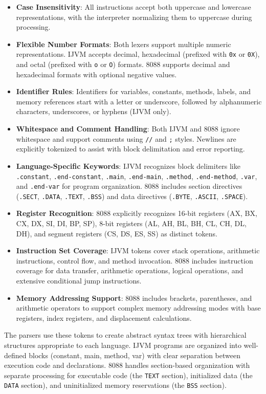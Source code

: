 \documentclass[11pt]{article}
\begin{document}
\begin{itemize}
\item \textbf{Case Insensitivity}: All instructions accept both uppercase and lowercase representations, with the interpreter normalizing them to uppercase during processing.
\item \textbf{Flexible Number Formats}: Both lexers support multiple numeric representations. IJVM accepts decimal, hexadecimal (prefixed with \texttt{0x} or \texttt{0X}), and octal (prefixed with \texttt{o} or \texttt{O}) formats. 8088 supports decimal and hexadecimal formats with optional negative values.
\item \textbf{Identifier Rules}: Identifiers for variables, constants, methods, labels, and memory references start with a letter or underscore, followed by alphanumeric characters, underscores, or hyphens (IJVM only).
\item \textbf{Whitespace and Comment Handling}: Both IJVM and 8088 ignore whitespace and support comments using \texttt{//} and \texttt{;} styles. Newlines are explicitly tokenized to assist with block delimitation and error reporting.
\item \textbf{Language-Specific Keywords}: IJVM recognizes block delimiters like \texttt{.constant}, \texttt{.end-constant}, \texttt{.main}, \texttt{.end-main}, \texttt{.method}, \texttt{.end-method}, \texttt{.var}, and \texttt{.end-var} for program organization. 8088 includes section directives (\texttt{.SECT}, \texttt{.DATA}, \texttt{.TEXT}, \texttt{.BSS}) and data directives (\texttt{.BYTE}, \texttt{.ASCII}, \texttt{.SPACE}).
\item \textbf{Register Recognition}: 8088 explicitly recognizes 16-bit registers (AX, BX, CX, DX, SI, DI, BP, SP), 8-bit registers (AL, AH, BL, BH, CL, CH, DL, DH), and segment registers (CS, DS, ES, SS) as distinct tokens.
\item \textbf{Instruction Set Coverage}: IJVM tokens cover stack operations, arithmetic instructions, control flow, and method invocation. 8088 includes instruction coverage for data transfer, arithmetic operations, logical operations, and extensive conditional jump instructions.
\item \textbf{Memory Addressing Support}: 8088 includes brackets, parentheses, and arithmetic operators to support complex memory addressing modes with base registers, index registers, and displacement calculations.
\end{itemize}

The parsers use these tokens to create abstract syntax trees with hierarchical structures appropriate to each language. IJVM programs are organized into well-defined blocks (constant, main, method, var) with clear separation between execution code and declarations. 8088 handles section-based organization with separate processing for executable code (the \texttt{TEXT} section), initialized data (the \texttt{DATA} section), and uninitialized memory reservations (the \texttt{BSS} section).
\end{document}
